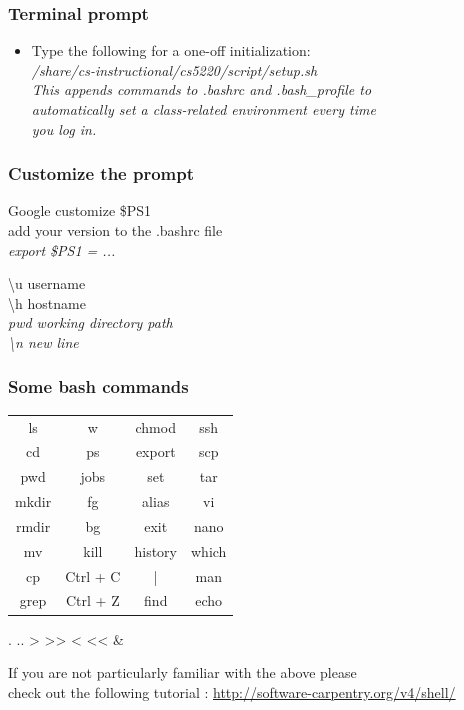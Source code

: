 \documentclass{beamer}
\begin{document}
\begin{frame}
  \frametitle{Terminal prompt}

  \begin{itemize}
  \item Type the following for a one-off initialization: \\
  \vspace{5mm}
  \it{/share/cs-instructional/cs5220/script/setup.sh} \\
  \vspace{5mm}
  This appends commands to .bashrc and .bash\_profile to \\
  automatically set a class-related environment every time \\
  you log in.
  \end{itemize}
\end{frame}

\begin{frame}
  \frametitle{Customize the prompt}

  Google customize \$PS1 \\
  add your version to the .bashrc file\\
  \vspace{5mm}
  \it{export \$PS1 = ...}
  \vspace{10mm}

  \textbackslash u		username\\
  \textbackslash h		hostname\\
  \it{pwd} 	working directory path\\
  \textbackslash n 		new line\\

\end{frame}

\begin{frame}
  \frametitle{Some bash commands}
  \begin{center}
    \begin{tabular}{ c c c c }
    ls & w & chmod & ssh \\
    cd & ps & export & scp \\
    pwd & jobs & set & tar \\
    mkdir & fg & alias & vi \\
    rmdir & bg & exit & nano \\
    mv & kill & history & which \\
    cp & Ctrl + C & | & man \\
    grep &  Ctrl + Z & find & echo \\
    \end{tabular}
  . .. > >> < << \&
  \end{center}
  \vspace{5mm}  

  If you are not particularly familiar with the above please \\
  check out the following tutorial :
  \url{http://software-carpentry.org/v4/shell/ }
\end{frame}
\end{document}

